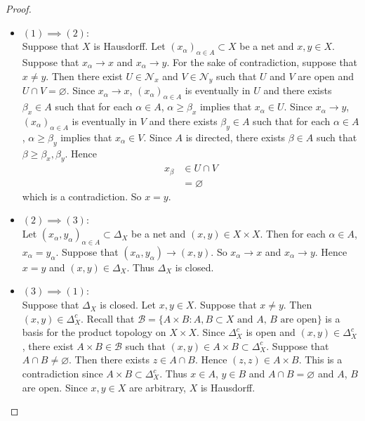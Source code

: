 \documentclass[12pt]{amsart}
\theoremstyle{definition}
\newcommand{\al}{\alpha}
\newcommand{\be}{\beta}
\newcommand{\Del}{\Delta}
\newcommand{\MB}{\mathcal{B}}
\newcommand{\MN}{\mathcal{N}}
\begin{document}
	\begin{proof}\
		\begin{itemize}
			\item $(1) \implies (2)$: \\
			Suppose that $X$ is Hausdorff. Let $(x_{\al})_{\al \in A} \subset X$ be a net and $x,y \in X$. Suppose that $x_{\al} \rightarrow x$ and $x_{\al} \rightarrow y$. For the sake of contradiction, suppose that $x \neq y$. Then there exist $U \in \MN_x$ and $V \in \MN_y$ such that $U$ and $V$ are open and $U \cap V = \varnothing$. Since $x_{\al} \rightarrow x$, $(x_{\al})_{\al \in A}$ is eventually in $U$ and there exists $\be_x \in A$ such that for each $\al \in A$, $\al \geq \be_x$ implies that $x_{\al} \in U$. Since $x_{\al} \rightarrow y$, $(x_{\al})_{\al \in A}$ is eventually in $V$ and there exists $\be_y \in A$ such that for each $\al \in A$, $\al \geq \be_y$ implies that $x_{\al} \in V$. Since $A$ is directed, there exists $\be \in A$ such that $\be \geq \be_x, \be_y$. Hence 
			\begin{align*}
				x_{\be} 
				& \in U \cap V \\
				& = \varnothing
			\end{align*}
			which is a contradiction. So $x = y$.
			\item $(2) \implies (3)$: \\
			Let $(x_{\al}, y_{\al})_{\al \in A} \subset \Del_X$ be a net and $(x,y) \in X \times X$. Then for each $\al \in A$, $x_{\al} = y_{\al}$. Suppose that $(x_{\al}, y_{\al}) \rightarrow (x,y)$. So $x_{\al} \rightarrow x$ and $x_{\al} \rightarrow y$. Hence $x = y$ and $(x,y) \in \Del_X$. Thus $\Del_X$ is closed.
			\item $(3) \implies (1)$: \\
			Suppose that $\Del_X$ is closed. Let $x,y \in X$. Suppose that $x \neq y$. Then $(x,y) \in \Del_X^c$. Recall that $\MB = \{A \times B: A,B \subset X \text{ and $A$, $B$ are open}\}$ is a basis for the product topology on $X \times X$. Since $\Del_X^c$ is open and $(x,y) \in \Del_X^c$, there exist $A \times B \in \MB$ such that $(x,y) \in A \times B \subset \Del_X^c$. Suppose that $A \cap B \neq \varnothing$. Then there exists $z \in A \cap B$. Hence $(z,z) \in A \times B$. This is a contradiction since $A  \times B \subset \Del_X^c$. Thus $x \in A$, $y \in B$ and $A \cap B = \varnothing$ and $A$, $B$ are open. Since $x,y \in X$ are arbitrary, $X$ is Hausdorff. 
		\end{itemize}
	\end{proof}
	
\end{document}
